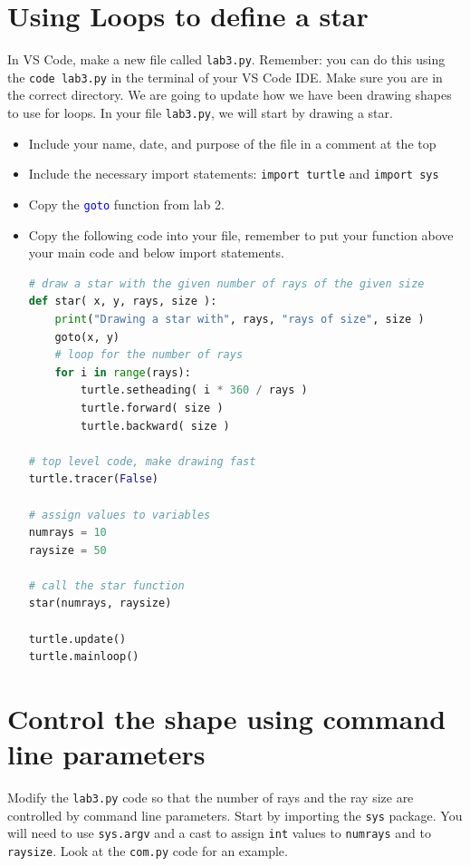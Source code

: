 \documentclass[12pt]{article}
\begin{document}
\section{Using Loops to define a star}
In VS Code, make a new file called \texttt{lab3.py}. Remember: you can do this using the \texttt{code lab3.py} in the terminal of your VS Code IDE. Make sure you are in the correct directory.
We are going to update how we have been drawing shapes to use for loops.
In your file \texttt{lab3.py}, we will start by drawing a star.
\begin{itemize}
\item Include your name, date, and purpose of the file in a comment at the top
\item Include the necessary import statements: \texttt{import turtle} and \texttt{import sys}
\item Copy the \textcolor{blue}{\texttt{goto}} function from lab 2. 
\item Copy the following code into your file, remember to put your function above your main code and below import statements.
\begin{lstlisting}[language=Python]
# draw a star with the given number of rays of the given size
def star( x, y, rays, size ):
    print("Drawing a star with", rays, "rays of size", size )
    goto(x, y)
    # loop for the number of rays
    for i in range(rays):
        turtle.setheading( i * 360 / rays )
        turtle.forward( size )
        turtle.backward( size )

# top level code, make drawing fast
turtle.tracer(False)

# assign values to variables
numrays = 10
raysize = 50

# call the star function
star(numrays, raysize)

turtle.update()
turtle.mainloop()

\end{lstlisting}
\end{itemize}

\section{Control the shape using command line parameters}
Modify the \texttt{lab3.py} code so that the number of rays and the ray size are controlled by command line parameters. Start by importing the \texttt{sys} package. You will need to use \texttt{sys.argv} and a cast to assign \texttt{int} values to \texttt{numrays} and to \texttt{raysize}. Look at the \texttt{com.py} code for an example.
\end{document}
